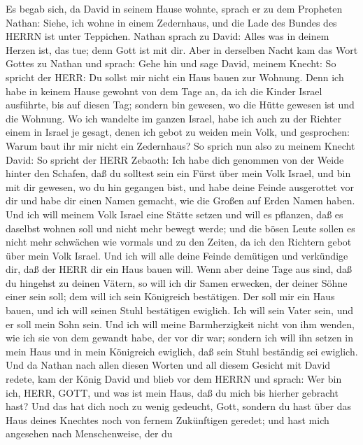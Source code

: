  Es begab sich, da David in seinem Hause wohnte, sprach er
zu dem Propheten Nathan: Siehe, ich wohne in einem Zedernhaus, und die
Lade des Bundes des HERRN ist unter Teppichen.  Nathan
sprach zu David: Alles was in deinem Herzen ist, das tue; denn Gott ist
mit dir.  Aber in derselben Nacht kam das Wort Gottes zu
Nathan und sprach:  Gehe hin und sage David, meinem Knecht:
So spricht der HERR: Du sollst mir nicht ein Haus bauen zur Wohnung.
 Denn ich habe in keinem Hause gewohnt von dem Tage an, da
ich die Kinder Israel ausführte, bis auf diesen Tag; sondern bin
gewesen, wo die Hütte gewesen ist und die Wohnung.  Wo ich
wandelte im ganzen Israel, habe ich auch zu der Richter einem in Israel
je gesagt, denen ich gebot zu weiden mein Volk, und gesprochen: Warum
baut ihr mir nicht ein Zedernhaus?  So sprich nun also zu
meinem Knecht David: So spricht der HERR Zebaoth: Ich habe dich genommen
von der Weide hinter den Schafen, daß du solltest sein ein Fürst über
mein Volk Israel,  und bin mit dir gewesen, wo du hin
gegangen bist, und habe deine Feinde ausgerottet vor dir und habe dir
einen Namen gemacht, wie die Großen auf Erden Namen haben. 
Und ich will meinem Volk Israel eine Stätte setzen und will es pflanzen,
daß es daselbst wohnen soll und nicht mehr bewegt werde; und die bösen
Leute sollen es nicht mehr schwächen wie vormals und zu den Zeiten, da
ich den Richtern gebot über mein Volk Israel.  Und ich will
alle deine Feinde demütigen und verkündige dir, daß der HERR dir ein
Haus bauen will.  Wenn aber deine Tage aus sind, daß du
hingehst zu deinen Vätern, so will ich dir Samen erwecken, der deiner
Söhne einer sein soll; dem will ich sein Königreich bestätigen.
 Der soll mir ein Haus bauen, und ich will seinen Stuhl
bestätigen ewiglich.  Ich will sein Vater sein, und er soll
mein Sohn sein. Und ich will meine Barmherzigkeit nicht von ihm wenden,
wie ich sie von dem gewandt habe, der vor dir war;  sondern
ich will ihn setzen in mein Haus und in mein Königreich ewiglich, daß
sein Stuhl beständig sei ewiglich.  Und da Nathan nach
allen diesen Worten und all diesem Gesicht mit David redete,
 kam der König David und blieb vor dem HERRN und sprach:
Wer bin ich, HERR, GOTT, und was ist mein Haus, daß du mich bis hierher
gebracht hast?  Und das hat dich noch zu wenig gedeucht,
Gott, sondern du hast über das Haus deines Knechtes noch von fernem
Zukünftigen geredet; und hast mich angesehen nach Menschenweise, der du
